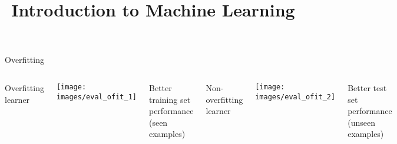 \documentclass[11pt,compress,t,notes=noshow, xcolor=table]{beamer}
\title{Introduction to Machine Learning}
\institute{\href{https://compstat-lmu.github.io/lecture_i2ml/}{compstat-lmu.github.io/lecture\_i2ml}}
\date{}
\newenvironment{knitrout}{}{} %
\begin{document}














\begin{vbframe}{Overfitting}

\begin{columns}[T,onlytextwidth]
Overfitting learner \\
\vspace{0.5cm}
\begin{knitrout}\scriptsize
{}\color{fgcolor}

{\centering \texttt{[image: images/eval\_ofit\_1]} 

}



\end{knitrout}
Better training set performance (seen examples)

Non-overfitting learner \\
\vspace{0.5cm}
\begin{knitrout}\scriptsize
{}\color{fgcolor}

{\centering \texttt{[image: images/eval\_ofit\_2]} 

}



\end{knitrout}
Better test set performance (unseen examples)
\end{columns}


\framebreak



\end{vbframe}
\end{document}
